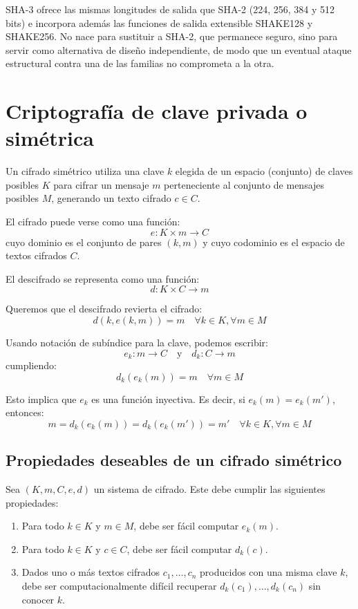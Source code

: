 SHA-3 ofrece las mismas longitudes de salida que SHA-2 (224, 256, 384 y 512 bits) e incorpora además las funciones de salida extensible SHAKE128 y SHAKE256. No nace para sustituir a SHA-2, que permanece seguro, sino para servir como alternativa de diseño independiente, de modo que un eventual ataque estructural contra una de las familias no comprometa a la otra.

\section{Criptografía de clave privada o simétrica}
Un cifrado simétrico utiliza una clave $k$ elegida de un espacio (conjunto) de claves posibles $K$ para cifrar un mensaje $m$ perteneciente al conjunto de mensajes posibles $M$, generando un texto cifrado $c \in C$.

El cifrado puede verse como una función:
\[
e : K \times m \rightarrow C
\]
cuyo dominio es el conjunto de pares $(k, m)$ y cuyo codominio es el espacio de textos cifrados $C$.

El descifrado se representa como una función:
\[
d : K \times C \rightarrow m
\]

Queremos que el descifrado revierta el cifrado:
\[
d(k, e(k, m)) = m \quad \forall k \in K, \forall m \in M
\]

Usando notación de subíndice para la clave, podemos escribir:
\[
e_k : m \rightarrow C \quad \text{y} \quad d_k : C \rightarrow m
\]
cumpliendo:
\[
d_k(e_k(m)) = m \quad \forall m \in M
\]

Esto implica que $e_k$ es una función inyectiva. Es decir, si $e_k(m) = e_k(m')$, entonces:
\[
m = d_k(e_k(m)) = d_k(e_k(m')) = m' \quad \forall k \in K, \forall m \in M
\]

\subsection*{Propiedades deseables de un cifrado simétrico}

Sea $(K, m, C, e, d)$ un sistema de cifrado. Este debe cumplir las siguientes propiedades:

\begin{enumerate}
    \item Para todo $k \in K$ y $m \in M$, debe ser fácil computar $e_k(m)$.
    \item Para todo $k \in K$ y $c \in C$, debe ser fácil computar $d_k(c)$.
    \item Dados uno o más textos cifrados $c_1, \ldots, c_n$ producidos con una misma clave $k$, debe ser computacionalmente difícil recuperar $d_k(c_1), \ldots, d_k(c_n)$ sin conocer $k$.
\end{enumerate}

